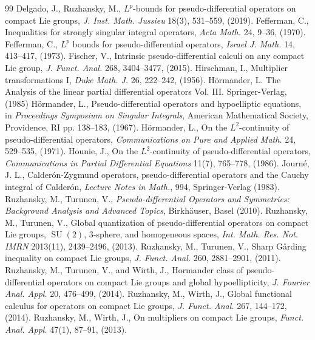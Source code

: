 \documentclass[12pt, reqno]{amsart}
\theoremstyle{definition}
\theoremstyle{remark}
\numberwithin{equation}{section}
\begin{document}
\begin{thebibliography}{99}
     Delgado, J., Ruzhansky, M., $L^p$-bounds for pseudo-differential operators on compact Lie groups, \textit{J. Inst. Math. Jussieu} 18(3), 531--559, (2019).
     Fefferman, C., Inequalities for strongly singular integral operators, \textit{Acta Math.} 24, 9--36, (1970).
     Fefferman, C., $L^p$ bounds for pseudo-differential operators, \textit{Israel J. Math.} 14, 413--417, (1973).
     Fischer, V., Intrinsic pseudo-differential calculi on any compact Lie group, \textit{J. Funct. Anal.} 268, 3404--3477, (2015).
     Hirschman, I., Multiplier transformations I, \textit{Duke Math. J.} 26, 222--242, (1956).
     H\"ormander, L. { The Analysis of the linear partial differential operators} Vol. III. Springer-Verlag, (1985)
     Hörmander, L., Pseudo-differential operators and hypoelliptic equations, in \textit{Proceedings Symposium on Singular Integrals}, American Mathematical Society, Providence, RI pp. 138--183, (1967).
     Hörmander, L., On the $L^2$-continuity of pseudo-differential operators, \textit{Communications on Pure and Applied Math.} 24, 529--535, (1971).
     Hounie, J., On the $L^2$-continuity of pseudo-differential operators, \textit{Communications in Partial Differential Equations} 11(7), 765--778, (1986).
     Journé, J. L., Calderón-Zygmund operators, pseudo-differential operators and the Cauchy integral of Calderón, \textit{Lecture Notes in Math.}, 994, Springer-Verlag (1983).
     Ruzhansky, M., Turunen, V., \textit{Pseudo-differential Operators and Symmetries: Background Analysis and Advanced Topics}, Birkhäuser, Basel (2010).
     Ruzhansky, M., Turunen, V., Global quantization of pseudo-differential operators on compact Lie groups, $\operatorname{SU}(2)$, 3-sphere, and homogeneous spaces, \textit{Int. Math. Res. Not. IMRN} 2013(11), 2439--2496, (2013).
     Ruzhansky, M., Turunen, V., Sharp Gårding inequality on compact Lie groups, \textit{J. Funct. Anal.} 260, 2881--2901, (2011).
     Ruzhansky, M., Turunen, V., and Wirth, J., Hormander class of pseudo-differential operators on compact Lie groups and global hypoellipticity, \textit{J. Fourier Anal. Appl.} 20, 476--499, (2014).
     Ruzhansky, M., Wirth, J., Global functional calculus for operators on compact Lie groups, \textit{J. Funct. Anal.} 267, 144--172, (2014).
     Ruzhansky, M., Wirth, J., On multipliers on compact Lie groups, \textit{Funct. Anal. Appl.} 47(1), 87--91, (2013).

\end{thebibliography}
\end{document}
